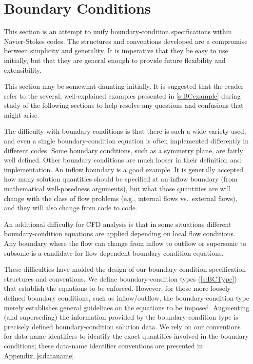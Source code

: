 \section{Boundary Conditions}
\label{s:BC}
\thispagestyle{plain}

This section is an attempt to unify boundary-condition specifications
within Navier-Stokes codes.  The structures and conventions developed
are a compromise between simplicity and generality.  It is imperative
that they be easy to use initially, but that they are general enough to
provide future flexibility and extensibility.

This section may be somewhat daunting initially.  It is suggested that
the reader refer to the several, well-explained examples presented in
\autoref{s:BCexample} during study of the following sections to help
resolve any questions and confusions that might arise.

The difficulty with boundary conditions is that there is such a wide
variety used, and even a single boundary-condition equation is often
implemented differently in different codes.  Some boundary conditions,
such as a symmetry plane, are fairly well defined.  Other boundary
conditions are much looser in their definition and implementation.
An inflow boundary is a good example.  It is generally accepted how
many solution quantities should be specified at an inflow boundary
(from mathematical well-posedness arguments), but what those quantities
are will change with the class of flow problems (e.g., internal flows
vs.~external flows), and they will also change from code to code.

An additional difficulty for CFD analysis is that in some situations
different boundary-condition equations are applied depending on local
flow conditions.  Any boundary where the flow can change from inflow
to outflow or supersonic to subsonic is a candidate for flow-dependent
boundary-condition equations.

These difficulties have molded the design of our boundary-condition
specification structures and conventions.  We define boundary-condition
types (\autoref{s:BCType}) that establish the equations to be enforced.
However, for those more loosely defined boundary conditions, such as
inflow/outflow, the boundary-condition type merely establishes general
guidelines on the equations to be imposed.  Augmenting (and superseding)
the information provided by the boundary-condition type is precisely
defined boundary-condition solution data.  We rely on our conventions
for data-name identifiers to identify the exact quantities involved in
the boundary conditions; these data-name identifier conventions are
presented in \hyperref[s:dataname]{Appendix~\ref*{s:dataname}}.

